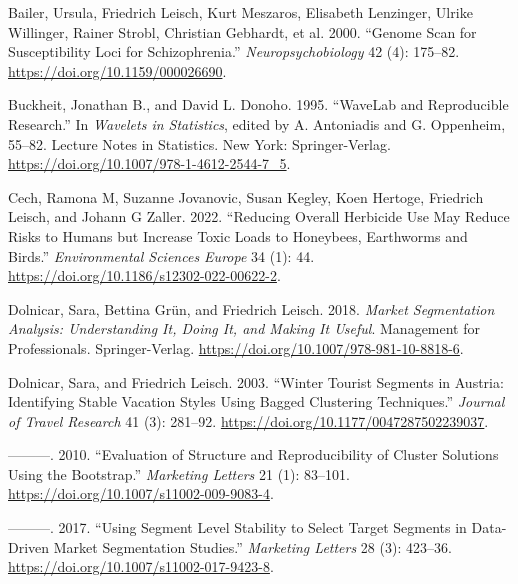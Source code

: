 \hypertarget{refs}{}
\begin{CSLReferences}{1}{0}
\leavevmode{}%
Bailer, Ursula, Friedrich Leisch, Kurt Meszaros, Elisabeth Lenzinger, Ulrike Willinger, Rainer Strobl, Christian Gebhardt, et al. 2000. {``Genome Scan for Susceptibility Loci for Schizophrenia.''} \emph{Neuropsychobiology} 42 (4): 175--82. \url{https://doi.org/10.1159/000026690}.

\leavevmode{}%
Buckheit, Jonathan B., and David L. Donoho. 1995. {``{WaveLab} and Reproducible Research.''} In \emph{Wavelets in Statistics}, edited by A. Antoniadis and G. Oppenheim, 55--82. Lecture Notes in Statistics. New York: Springer-Verlag. \url{https://doi.org/10.1007/978-1-4612-2544-7_5}.

\leavevmode{}%
Cech, Ramona M, Suzanne Jovanovic, Susan Kegley, Koen Hertoge, Friedrich Leisch, and Johann G Zaller. 2022. {``Reducing Overall Herbicide Use May Reduce Risks to Humans but Increase Toxic Loads to Honeybees, Earthworms and Birds.''} \emph{Environmental Sciences Europe} 34 (1): 44. \url{https://doi.org/10.1186/s12302-022-00622-2}.

\leavevmode{}%
Dolnicar, Sara, Bettina Grün, and Friedrich Leisch. 2018. \emph{Market Segmentation Analysis: Understanding It, Doing It, and Making It Useful}. Management for Professionals. Springer-Verlag. \url{https://doi.org/10.1007/978-981-10-8818-6}.

\leavevmode{}%
Dolnicar, Sara, and Friedrich Leisch. 2003. {``Winter Tourist Segments in {A}ustria: Identifying Stable Vacation Styles Using Bagged Clustering Techniques.''} \emph{Journal of Travel Research} 41 (3): 281--92. \url{https://doi.org/10.1177/0047287502239037}.

\leavevmode{}%
---------. 2010. {``Evaluation of Structure and Reproducibility of Cluster Solutions Using the Bootstrap.''} \emph{Marketing Letters} 21 (1): 83--101. \url{https://doi.org/10.1007/s11002-009-9083-4}.

\leavevmode{}%
---------. 2017. {``Using Segment Level Stability to Select Target Segments in Data-Driven Market Segmentation Studies.''} \emph{Marketing Letters} 28 (3): 423--36. \url{https://doi.org/10.1007/s11002-017-9423-8}.


\end{CSLReferences}
